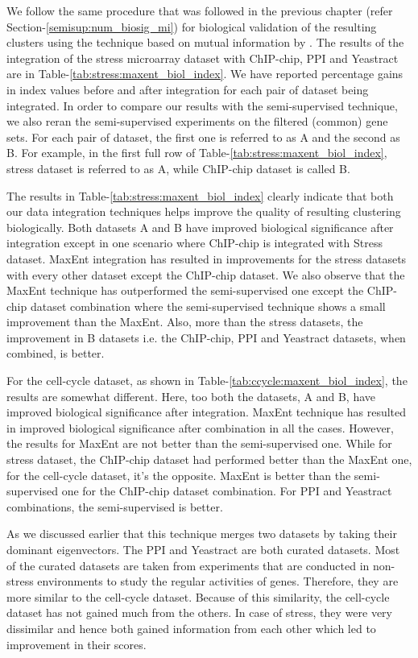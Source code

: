 We follow the same procedure that was followed in the previous chapter (refer Section-\ref{semisup:num_biosig_mi}) for biological validation of the resulting clusters using the technique based on 
mutual information by \citet{Gibons2002Judging}. The results of the integration of the stress microarray dataset with ChIP-chip, PPI and Yeastract are in 
Table-\ref{tab:stress:maxent_biol_index}. We have reported percentage gains in index values before and after integration for each pair of dataset being integrated. In order to compare our 
results with the semi-supervised technique, we also reran the semi-supervised experiments on the filtered (common) gene sets. For each pair of dataset, the first one is referred 
to as A and the second as B. For example, in the first full row of Table-\ref{tab:stress:maxent_biol_index}, stress dataset is referred to as A, while ChIP-chip dataset is called B. 

The results in Table-\ref{tab:stress:maxent_biol_index} clearly indicate that both our data integration techniques helps improve the quality of resulting clustering biologically. 
Both datasets A and B have improved biological significance after integration except in one scenario where ChIP-chip is integrated with Stress dataset. MaxEnt 
integration has resulted in improvements for the stress datasets with every other dataset except the ChIP-chip dataset. We also observe that the MaxEnt technique has outperformed 
the semi-supervised one except the ChIP-chip dataset combination where the semi-supervised technique shows a small improvement than the MaxEnt. 
Also, more than the stress datasets, the improvement in B datasets i.e. the ChIP-chip, PPI and Yeastract datasets, when combined, is better. 

For the cell-cycle dataset, as shown in Table-\ref{tab:ccycle:maxent_biol_index}, the results are somewhat different. Here, too both the datasets, A and B, have improved biological 
significance after integration. MaxEnt technique has resulted in improved biological significance
after combination in all the cases. However, the results for MaxEnt are not better than the semi-supervised one. While for stress dataset, the ChIP-chip dataset had performed 
better than the MaxEnt one, for the cell-cycle dataset, it's the opposite. MaxEnt is better than the semi-supervised one for the ChIP-chip dataset combination. 
For PPI and Yeastract combinations, the semi-supervised is better.
 
As we discussed earlier that this technique merges two datasets by taking their dominant eigenvectors. The PPI and Yeastract 
are both curated datasets. Most of the curated datasets are taken from experiments that are conducted in non-stress environments to study the regular activities of genes. 
Therefore, they are more similar to the cell-cycle dataset. Because of this similarity, the cell-cycle dataset has not gained much from the others. 
In case of stress, they were very dissimilar and hence both gained information from each other which led to improvement in their scores.    

